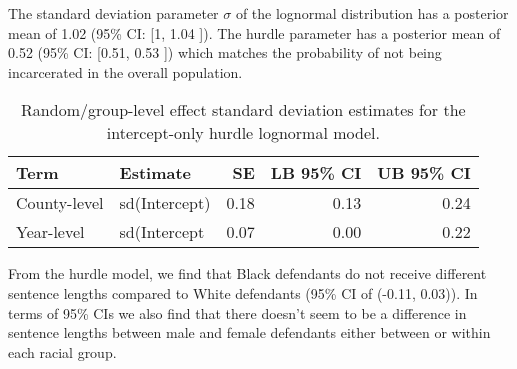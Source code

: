 \documentclass[
  letterpaper,
  DIV=11,
  numbers=noendperiod]{scrartcl}
\begin{document}
The standard deviation parameter \(\sigma\) of the lognormal
distribution has a posterior mean of 1.02 (95\% CI: {[}1, 1.04 {]}). The
hurdle parameter has a posterior mean of 0.52 (95\% CI: {[}0.51, 0.53
{]}) which matches the probability of not being incarcerated in the
overall population.

\hypertarget{tbl-brms1-group-eff}{}
\begin{table}
\caption{\label{tbl-brms1-group-eff}Random/group-level effect standard deviation estimates for the
intercept-only hurdle lognormal model. }\tabularnewline

\centering
\begin{tabular}{llrrr}
\toprule
Term & Estimate & SE & LB 95\% CI & UB 95\% CI\\
\midrule
County-level & sd(Intercept) & 0.18 & 0.13 & 0.24\\
Year-level & sd(Intercept & 0.07 & 0.00 & 0.22\\
\bottomrule
\end{tabular}
\end{table}

From the hurdle model, we find that Black defendants do not receive
different sentence lengths compared to White defendants (95\% CI of
(-0.11, 0.03)). In terms of 95\% CIs we also find that there doesn't
seem to be a difference in sentence lengths between male and female
defendants either between or within each racial group.
\end{document}
